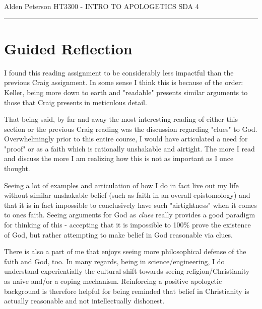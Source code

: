 \documentclass[12pt]{turabian-researchpaper}
\begin{document}
\begin{singlespace}
\noindent Alden Peterson \newline
\noindent HT3300 - INTRO TO APOLOGETICS \newline
\noindent SDA 4 \newline
\noindent\rule{4cm}{0.4pt}
\end{singlespace}

\section{Guided Reflection}

I found this reading assignment to be considerably less impactful than the previous Craig assignment. In some sense I think this is because of the order: Keller, being more down to earth and "readable" presents similar arguments to those that Craig presents in meticulous detail.

That being said, by far and away the most interesting reading of either this section or the previous Craig reading was the discussion regarding "clues" to God. Overwhelmingly prior to this entire course, I would have articulated a need for "proof" or as a faith which is rationally unshakable and airtight. The more I read and discuss the more I am realizing how this is not as important as I once thought.

Seeing a lot of examples and articulation of how I do in fact live out my life without similar unshakable belief (such as faith in an overall epistomology) and that it is in fact impossible to conclusively have such "airtightness" when it comes to ones faith. Seeing arguments for God as \textit{clues} really provides a good paradigm for thinking of this - accepting that it is impossible to 100\% prove the existence of God, but rather attempting to make belief in God reasonable via clues.

There is also a part of me that enjoys seeing more philosophical defense of the faith and God, too. In many regards, being in science/engineering, I do understand experientially the cultural shift towards seeing religion/Christianity as naive and/or a coping mechanism. Reinforcing a positive apologetic background is therefore helpful for being reminded that belief in Christianity is actually reasonable and not intellectually dishonest. 
\end{document}
